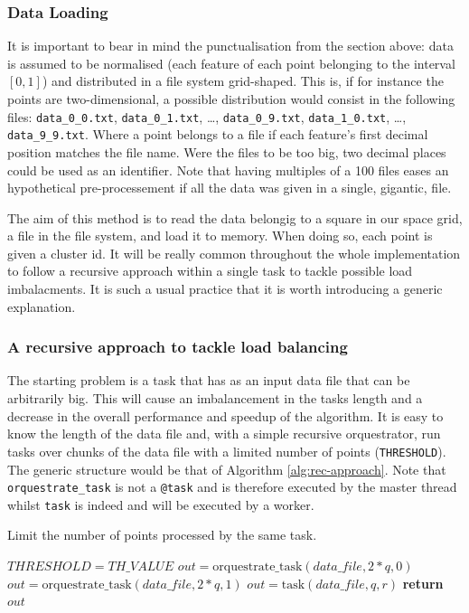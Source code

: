 \documentclass[10pt,journal,compsoc]{IEEEtran}
\let\MYoriglatexcaption\caption
\renewcommand{\caption}[2][\relax]{\MYoriglatexcaption[#2]{#2}}
\begin{document}
\subsubsection{Data Loading} \label{data_pre_process}
It is important to bear in mind the punctualisation from the section above: data is assumed to be normalised (each feature of each point belonging to the interval $[0,1]$) and distributed in a file system grid-shaped. This is, if for instance the points are two-dimensional, a possible distribution would consist in the following files: \texttt{data\_0\_0.txt}, \texttt{data\_0\_1.txt}, \dots, \texttt{data\_0\_9.txt}, \texttt{data\_1\_0.txt}, \dots, \texttt{data\_9\_9.txt}. Where a point belongs to a file if each feature's first decimal position matches the file name. Were the files to be too big, two decimal places could be used as an identifier. Note that having multiples of a 100 files eases an hypothetical pre-processement if all the data was given in a single, gigantic, file.

The aim of this method is to read the data belongig to a square in our space grid, a file in the file system, and load it to memory. When doing so, each point is given a cluster id. It will be really common throughout the whole implementation to follow a recursive approach within a single task to tackle possible load imbalacments. It is such a usual practice that it is worth introducing a generic explanation.

\subsubsection*{A recursive approach to tackle load balancing} \label{recursive_approach}
The starting problem is a task that has as an input data file that can be arbitrarily big. This will cause an imbalancement in the tasks length and a decrease in the overall performance and speedup of the algorithm. It is easy to know the length of the data file and, with a simple recursive orquestrator, run tasks over chunks of the data file with a limited number of points (\texttt{THRESHOLD}). The generic structure would be that of Algorithm \ref{alg:rec-approach}. Note that \texttt{orquestrate\_task} is not a \texttt{@task} and is therefore executed by the master thread whilst \texttt{task} is indeed and will be executed by a worker.

\begin{algorithm}
  \caption{Limit the number of points processed by the same task. \label{alg:rec-approach}}
  \begin{algorithmic}[1]
        \State $THRESHOLD = TH\_VALUE$
                \State $out = \text{orquestrate\_task}(data\_file, 2*q, 0)$
                \State $out = \text{orquestrate\_task}(data\_file, 2*q, 1)$
            \Else
                \State $out = \text{task}(data\_file, q, r)$
            \EndIf
        \State \textbf{return} $out$
    \EndFunction
  \end{algorithmic}
\end{algorithm}
\end{document}
